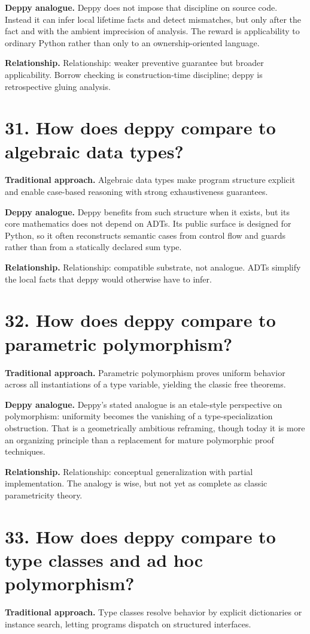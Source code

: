 \documentclass[11pt,openany]{book}
\begin{document}
\textbf{Deppy analogue.} Deppy does not impose that discipline on source code. Instead it can infer local lifetime facts and detect mismatches, but only after the fact and with the ambient imprecision of analysis. The reward is applicability to ordinary Python rather than only to an ownership-oriented language.

\textbf{Relationship.} Relationship: weaker preventive guarantee but broader applicability. Borrow checking is construction-time discipline; deppy is retrospective gluing analysis.

\section*{31. How does deppy compare to algebraic data types?}
\textbf{Traditional approach.} Algebraic data types make program structure explicit and enable case-based reasoning with strong exhaustiveness guarantees.

\textbf{Deppy analogue.} Deppy benefits from such structure when it exists, but its core mathematics does not depend on ADTs. Its public surface is designed for Python, so it often reconstructs semantic cases from control flow and guards rather than from a statically declared sum type.

\textbf{Relationship.} Relationship: compatible substrate, not analogue. ADTs simplify the local facts that deppy would otherwise have to infer.

\section*{32. How does deppy compare to parametric polymorphism?}
\textbf{Traditional approach.} Parametric polymorphism proves uniform behavior across all instantiations of a type variable, yielding the classic free theorems.

\textbf{Deppy analogue.} Deppy's stated analogue is an etale-style perspective on polymorphism: uniformity becomes the vanishing of a type-specialization obstruction. That is a geometrically ambitious reframing, though today it is more an organizing principle than a replacement for mature polymorphic proof techniques.

\textbf{Relationship.} Relationship: conceptual generalization with partial implementation. The analogy is wise, but not yet as complete as classic parametricity theory.

\section*{33. How does deppy compare to type classes and ad hoc polymorphism?}
\textbf{Traditional approach.} Type classes resolve behavior by explicit dictionaries or instance search, letting programs dispatch on structured interfaces.
\end{document}
